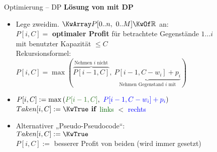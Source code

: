 \begin{frame}[t]{Optimierung – DP}
	\vspace{-.5\baselineskip}
	\textbf{Lösung von \Knapsack mit DP}  
	\begin{itemize}
		\item Lege zweidim. $\KwArray P[0..n, \ 0..M] \KwOf \R$ an: \\ 
		\impl $P[i, C] = $ \textbf{optimaler Profit} für betrachtete Gegenstände $1...i$ \\ mit benutzter Kapazität $\leq C$ \\
		\impl Rekursionsformel: \\ \vspace{-.7\baselineskip}
		\qqquad \quad $P[i, C] = \max\left(\overbrace{P[i-1, C]}^\text{Nehmen $i$ nicht}, \ \underbrace{P[i-1, C - w_i] + p_i}_\text{Nehmen Gegenstand $i$ mit}\right)$
		\pause 
		\item 
		 \vspace{-\baselineskip}
		\quad $P[i, C] := \max\left(\textcolor{darkgreen}{P[i-1, C]}, \ \textcolor{blue}{P[i-1, C - w_i] + p_i}\right)$ \\
		\quad $Taken[i, C] := \KwTrue \KwSty{ if} $ \textcolor{darkgreen}{links} $ < $ \textcolor{blue}{rechts}
		\pause
		\item Alternativer „Pseudo-Pseudocode“: \\
		\vspace{-\baselineskip}
		\quad {} 
		\qquad 		$Taken[i, C] := \KwTrue$ \\
		\quad		$P[i, C] := $ besserer Profit von beiden \quad (wird immer gesetzt)
		  
		
	\end{itemize}
\end{frame}

